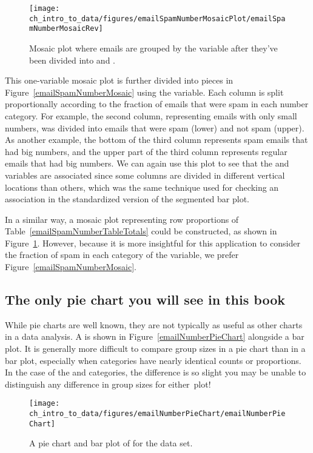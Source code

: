 \begin{figure}
   \centering
   \texttt{[image: ch\_intro\_to\_data/figures/emailSpamNumberMosaicPlot/emailSpamNumberMosaicRev]}
   \caption{Mosaic plot where emails are grouped by the  variable after they've been divided into  and .}
   \label{emailSpamNumberMosaicRev}
\end{figure}

This one-variable mosaic plot is further divided into pieces in Figure~\ref{emailSpamNumberMosaic} using the  variable. Each column is split proportionally according to the fraction of emails that were spam in each number category. For example, the second column, representing emails with only small numbers, was divided into emails that were spam (lower) and not spam (upper).
As another example, the bottom of the third column represents spam emails that had big numbers, and the upper part of the third column represents regular emails that had big numbers. We can again use this plot to see that the  and  variables are associated since some columns are divided in different vertical locations than others, which was the same technique used for checking an association in the standardized version of the segmented bar plot.

In a similar way, a mosaic plot representing row proportions of Table~\ref{emailSpamNumberTableTotals} could be constructed, as shown in Figure~\ref{emailSpamNumberMosaicRev}. However, because it is more insightful for this application to consider the fraction of spam in each category of the  variable, we prefer Figure~\ref{emailSpamNumberMosaic}.

\subsection{The only pie chart you will see in this book}

While pie charts are well known, they are not typically as useful as other charts in a data analysis. A  is shown in Figure~\vref{emailNumberPieChart} alongside a bar plot. It is generally more difficult to compare group sizes in a pie chart than in a bar plot, especially when categories have nearly identical counts or proportions. In the case of the  and  categories, the difference is so slight you may be unable to distinguish any difference in group sizes for either~plot!

\begin{figure}[h]
   \centering
   \texttt{[image: ch\_intro\_to\_data/figures/emailNumberPieChart/emailNumberPieChart]}
   \caption{A pie chart and bar plot of  for the  data set.}
   \label{emailNumberPieChart}
\end{figure}

